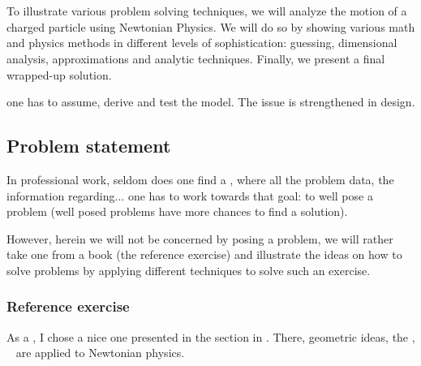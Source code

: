 \chapter{\docTitle}
%
%
To illustrate various problem solving techniques, we
%
%
will analyze the motion of a charged particle using Newtonian Physics. We will do so by showing various math and physics methods in different levels of sophistication: guessing, dimensional analysis, approximations and analytic techniques. Finally, we present a final wrapped-up solution.

one has to assume, derive and test the model. The issue is strengthened in design.


\section{Problem statement}
%
In professional work, seldom does one find a , where all the problem data, the information regarding...  one has to work towards that goal: to well pose a problem (well posed problems have more chances to find a solution).

However, herein we will not be concerned by posing a problem, we will rather take one from a book (the reference exercise) and illustrate the ideas on how to solve problems by applying different techniques to solve such an exercise.
%
%


\subsection{Reference exercise}\label{sec:referenceexercise}
%
As a , I chose a nice one presented in the  section in \cite[chap. 1, p. 8]{thorne:2011}. There, geometric ideas, \via the ,
%
~
%
are applied to Newtonian physics.

